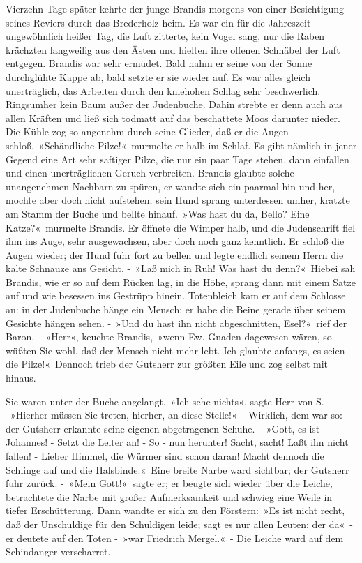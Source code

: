 Vierzehn Tage später kehrte der junge Brandis morgens von einer Besichtigung seines Reviers durch das Brederholz heim. Es war ein für die Jahreszeit ungewöhnlich heißer Tag, die Luft zitterte, kein Vogel sang, nur die Raben krächzten langweilig aus den Ästen und hielten ihre offenen Schnäbel der Luft entgegen. Brandis war sehr ermüdet. Bald nahm er seine von der Sonne durchglühte Kappe ab, bald setzte er sie wieder auf. Es war alles gleich unerträglich, das Arbeiten durch den kniehohen Schlag sehr beschwerlich. Ringsumher kein Baum außer der Judenbuche. Dahin strebte er denn auch aus allen Kräften und ließ sich todmatt auf das beschattete Moos darunter nieder. Die Kühle zog so angenehm durch seine Glieder, daß er die Augen schloß. »Schändliche Pilze!« murmelte er halb im Schlaf. Es gibt nämlich in jener Gegend eine Art sehr saftiger Pilze, die nur ein paar Tage stehen, dann einfallen und einen unerträglichen Geruch verbreiten. Brandis glaubte solche unangenehmen Nachbarn zu spüren, er wandte sich ein paarmal hin und her, mochte aber doch nicht aufstehen; sein Hund sprang unterdessen umher, kratzte am Stamm der Buche und bellte hinauf. »Was hast du da, Bello? Eine Katze?« murmelte Brandis. Er öffnete die Wimper halb, und die Judenschrift fiel ihm ins Auge, sehr ausgewachsen, aber doch noch ganz kenntlich. Er schloß die Augen wieder; der Hund fuhr fort zu bellen und legte endlich seinem Herrn die kalte Schnauze ans Gesicht. - »Laß mich in Ruh! Was hast du denn?« Hiebei sah Brandis, wie er so auf dem Rücken lag, in die Höhe, sprang dann mit einem Satze auf und wie besessen ins Gestrüpp hinein. Totenbleich kam er auf dem Schlosse an: in der Judenbuche hänge ein Mensch; er habe die Beine gerade über seinem Gesichte hängen sehen. - »Und du hast ihn nicht abgeschnitten, Esel?« rief der Baron. - »Herr«, keuchte Brandis, »wenn Ew. Gnaden dagewesen wären, so wüßten Sie wohl, daß der Mensch nicht mehr lebt. Ich glaubte anfangs, es seien die Pilze!« Dennoch trieb der Gutsherr zur größten Eile und zog selbst mit hinaus.

Sie waren unter der Buche angelangt. »Ich sehe nichts«, sagte Herr von S. - »Hierher müssen Sie treten, hierher, an diese Stelle!« - Wirklich, dem war so: der Gutsherr erkannte seine eigenen abgetragenen Schuhe. - »Gott, es ist Johannes! - Setzt die Leiter an! - So - nun herunter! Sacht, sacht! Laßt ihn nicht fallen! - Lieber Himmel, die Würmer sind schon daran! Macht dennoch die Schlinge auf und die Halsbinde.« Eine breite Narbe ward sichtbar; der Gutsherr fuhr zurück. - »Mein Gott!« sagte er; er beugte sich wieder über die Leiche, betrachtete die Narbe mit großer Aufmerksamkeit und schwieg eine Weile in tiefer Erschütterung. Dann wandte er sich zu den Förstern: »Es ist nicht recht, daß der Unschuldige für den Schuldigen leide; sagt es nur allen Leuten: der da« - er deutete auf den Toten - »war Friedrich Mergel.« - Die Leiche ward auf dem Schindanger verscharret.

